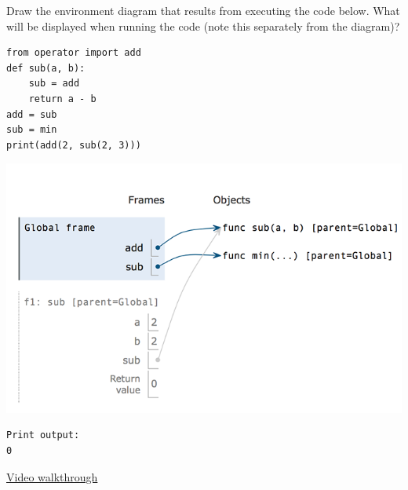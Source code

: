 
\begin{blocksection}
\question Draw the environment diagram that results from executing the
code below. What will be displayed when running the code (note this separately 
from the diagram)?

\begin{lstlisting}
from operator import add
def sub(a, b):
    sub = add
    return a - b
add = sub
sub = min
print(add(2, sub(2, 3)))
\end{lstlisting}

\begin{solution}[2.5in]
\begin{center}
\includegraphics{add-sub.png}
\begin{lstlisting}
Print output:
0
\end{lstlisting}
\end{center}
\href{https://www.youtube.com/watch?v=Fiw0f5yuQgo&vq=hd1080&t=59m22s}{Video walkthrough}
\end{solution}
\end{blocksection}
